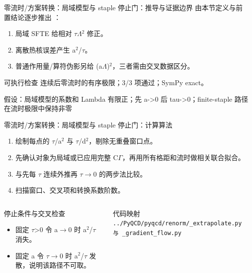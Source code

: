 \begin{frame}[t]{零流时/\allowbreak{}方案转换：局域模型与 staple 停止门：推导与证据边界}
\footnotesize
{}\quad 由本节定义与前置结论逐步推出 ：
\begin{enumerate}
\item 局域 SFTE 给相对 \ensuremath{\tau}\ensuremath{\Lambda}\ensuremath{^{2}} 修正。
\item 离散热核误差产生 a\ensuremath{^{2}}/\allowbreak{}\ensuremath{\tau}。
\item 普通作用量/\allowbreak{}算符伪影另给 (a\ensuremath{\Lambda})\ensuremath{^{2}}，三者需由交叉数据区分。
\end{enumerate}\begin{block}{可执行检查}
\quad 连续后零流时的有序极限；3/3 项通过；SymPy exact。
\par\scriptsize 假设：局域模型的系数和 Lambda 有限正；先 a->0 后 tau->0；finite-staple 路径在流时极限中保持非零
\end{block}
\end{frame}

\begin{frame}[t]{零流时/\allowbreak{}方案转换：局域模型与 staple 停止门：计算算法}
\footnotesize
{}\begin{enumerate}
\item 绘制每点的 \ensuremath{\tau}/\allowbreak{}a\ensuremath{^{2}} 与 \ensuremath{\tau}/\allowbreak{}d\ensuremath{^{2}}，剔除无重叠窗口点。
\item 先确认对象为局域或已应用完整 C\ensuremath{\Gamma}，再用所有格距和流时做相关联合拟合。
\item 与先每 \ensuremath{\tau} 连续外推再 \ensuremath{\tau}\ensuremath{\rightarrow}0 的两步法比较。
\item 扫描窗口、交叉项和转换系数阶数。
\end{enumerate}\begin{columns}[T,onlytextwidth]
\begin{block}{停止条件与交叉检查}\scriptsize\begin{itemize}
\item[\CheckMark] 固定 \ensuremath{\tau}>0 令 a\ensuremath{\rightarrow}0 时 a\ensuremath{^{2}}/\allowbreak{}\ensuremath{\tau} 消失。
\item[\CheckMark] 固定 a 令 \ensuremath{\tau}\ensuremath{\rightarrow}0 时 a\ensuremath{^{2}}/\allowbreak{}\ensuremath{\tau} 发散，说明该路径不可取。
\end{itemize}\end{block}
\begin{block}{代码映射}
\scriptsize \texttt{.\allowbreak{}.\allowbreak{}/\allowbreak{}PyQCD/\allowbreak{}pyqcd/\allowbreak{}renorm/\allowbreak{}\_\allowbreak{}extrapolate.\allowbreak{}py 与 \_\allowbreak{}gradient\_\allowbreak{}flow.\allowbreak{}py}
\end{block}\end{columns}\end{frame}

